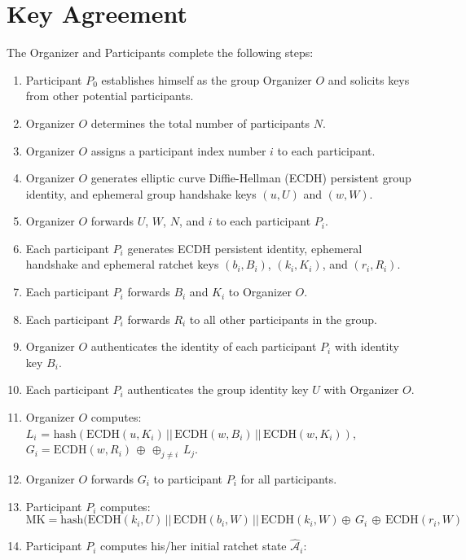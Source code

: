 \documentclass[%
preprint,
amsmath,amssymb,
aps,
prb,
floatfix,
]{revtex4-1}
\begin{document}
\section{\label{sec:keyagreement}Key Agreement}
The Organizer and Participants complete the following steps:
\begin{enumerate}
\item Participant $P_0$ establishes himself as the group Organizer $O$ and solicits
keys from other potential participants.
\item Organizer $O$ determines the total number of participants $N$.
\item Organizer $O$ assigns a participant index number $i$ to each
participant.
\item Organizer $O$ generates elliptic curve Diffie-Hellman (ECDH) persistent group
identity, and ephemeral group handshake
keys $(u, U )$ and $(w, W)$.
\item Organizer $O$ forwards $U$, $W$, $N$, and $i$ to each participant $P_i$.
\item Each participant $P_i$ generates ECDH
persistent identity, ephemeral handshake and ephemeral ratchet keys $(b_i, B_i)$,
$(k_i, K_i)$, and $(r_i, R_i)$.
\item Each participant $P_i$ forwards $B_i$ and $K_i$ to Organizer $O$.
\item Each participant $P_i$ forwards $R_i$ to all other participants in the
group.
\item Organizer $O$ authenticates the identity of each participant $P_i$ with
identity key $B_i$.
\item Each participant $P_i$ authenticates the group identity key $U$ with Organizer
$O$.
\item Organizer $O$ computes:\\
$L_i$ = $\mathrm{hash}(\mathrm{ECDH}(u, K_i) \,
|| \, \mathrm{ECDH}(w, B_i) \, || \, \mathrm{ECDH}(w, K_i))$,\\
$G_i = \mathrm{ECDH} (w, R_i) \, \oplus \, \oplus_{j \ne i} \, L_j$.
\item Organizer $O$ forwards $G_i$ to participant $P_i$ for all participants.
\item Participant $P_i$ computes:\\
$\mathrm{MK} = \mathrm{hash}(\mathrm{ECDH}(k_i, U) \, ||
\, \mathrm{ECDH}(b_i, W) \, || \, \mathrm{ECDH}(k_i, W) \oplus \, G_i \, \oplus
\, \mathrm{ECDH}(r_i, W)$
\item Participant $P_i$ computes his/her initial ratchet state $\mathcal{\hat{A}}_i$:\\

\end{enumerate}
\end{document}

